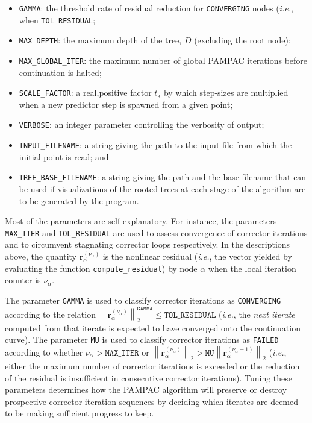 \documentclass{article}
\renewcommand{\vec}[1]{{\mathbf{#1}}}
\newcommand{\norm}[1]{\ensuremath{\left\lVert #1 \right\rVert}}
\newcommand{\ie}{\textit{i.e.}}
\newcommand{\pampac}{\textsc{PAMPAC}\xspace}
\newcommand{\YELLOW}{\texttt{CONVERGING}\xspace}
\newcommand{\BLACK}{\texttt{FAILED}\xspace}
\begin{document}
\begin{itemize}
%
\item \verb+GAMMA+: the threshold rate of residual reduction for \YELLOW nodes \newline
(\ie, when \smash{$\mathtt{GAMMA}\log\norm{\vec{r}_{\alpha}^{(\nu_\alpha)}}_2\le\log\,$}\verb+TOL_RESIDUAL+;
%
\item \verb+MAX_DEPTH+: the maximum depth of the tree, $D$ (excluding the root node);
%
\item \verb+MAX_GLOBAL_ITER+: the maximum number of global \pampac iterations before continuation is halted;
%
\item \verb+SCALE_FACTOR+: a real,positive factor $t_{\mathtt{K}}$ by which step-sizes are multiplied when a new predictor step is spawned from a given point;
%
\item \verb+VERBOSE+: an integer parameter controlling the verbosity of output;
%
\item \verb+INPUT_FILENAME+: a string giving the path to the input file from which the initial point is read; and
%
\item \verb+TREE_BASE_FILENAME+: a string giving the path and the base filename that can be used if visualizations of
the rooted trees at each stage of the algorithm are to be generated by the program.
%
\end{itemize}
%

Most of the parameters are self-explanatory.
%
For instance, the parameters \verb^MAX_ITER^ and \verb.TOL_RESIDUAL. are used to assess convergence of
corrector iterations and to circumvent stagnating corrector loops respectively.
%
In the descriptions above, the quantity $\vec{r}_{\alpha}^{(\nu_\alpha)}$ is the nonlinear residual (\ie, the vector yielded by evaluating the function \verb+compute_residual+) by node $\alpha$ when the local iteration counter is $\nu_\alpha$. 
%

The parameter \verb+GAMMA+ is used to classify corrector iterations as \YELLOW according to the relation
$\norm{\vec{r}_{\alpha}^{(\nu_\alpha)}}_{2}^{\mathtt{GAMMA}} \le\mathtt{TOL\_RESIDUAL}$ (\ie, the \textit{next iterate} computed from that iterate is expected to have converged onto the continuation curve).
%
The parameter \verb+MU+ is used to classify corrector iterations as \BLACK according to whether
$\nu_{\alpha}>\mathtt{MAX\_ITER}$ or $\norm{\vec{r}_{\alpha}^{(\nu_\alpha)}}_{2} > {\mathtt{MU}} \norm{\vec{r}_{\alpha}^{(\nu_\alpha-1)}}_{2}$
(\ie, either the maximum number of corrector iterations is exceeded or the reduction of the residual
is insufficient in consecutive corrector iterations).
%
Tuning these parameters determines how the \pampac algorithm will preserve or destroy prospective corrector iteration
sequences by deciding which iterates are deemed to be making sufficient progress to keep.
\end{document}
